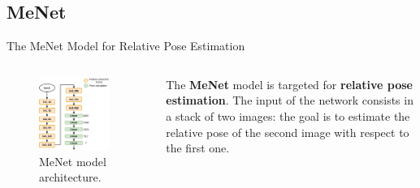 \documentclass[
    center,
]{beamer}
\begin{document}
\subsection{MeNet}
\begin{frame}{The MeNet Model for Relative Pose Estimation}
    \begin{columns}
        \begin{figure}
            \centering
            \includegraphics[width=0.9\textwidth]{../imgs/menet_structure.png}
            \caption{MeNet model architecture.}
        \end{figure}

        The \textbf{MeNet} model is targeted for \textbf{relative pose estimation}.
        The input of the network consists in a stack of two images: the goal is to estimate the relative pose of the second image with respect to the first one.
    \end{columns}
\end{frame}
\end{document}
